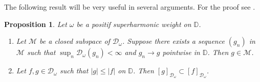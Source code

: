 \documentclass[12pt,reqno,a4paper]{amsart}
\newtheorem{prop}{Proposition}[section]
\newcommand{\D}{\mathbb{D}}
\newcommand{\Lat}{\mathrm{Lat}}
\newcommand{\cM}{{\mathcal{M}}}
\newcommand\DD{\mathbb{D}}
\newcommand{\cD}{{\mathcal{D}}}
\numberwithin{equation}{section}
\begin{document}
	
	The following result will be very useful in several arguments. For the proof see \cite{Al}.  
	\begin{prop}\label{coro1}
		Let $\omega$ be a positif superharmonic weight on $\DD$.
		\begin{enumerate}
			\item[A.] Let $\mathcal{M}$ be a closed subspace of $\cD_\omega$. Suppose there exists a sequence $(g_n)$ in $\mathcal{M}$ such that $\sup_{n} \cD_\omega(g_n) < \infty$ and $g_n \to g$ pointwise in $\mathbb{D}$. Then $g \in \mathcal{M}$.\\
			\item[B.] Let $f,g\in \cD_\omega$ such that $\vert g \vert \leq \vert f \vert $ on $ \D$. Then $\left[  g  \right]_{\cD_\omega}\subset \left[  f  \right]_{\cD_\omega}$. \\
		\end{enumerate}
	\end{prop}
	
\end{document}
